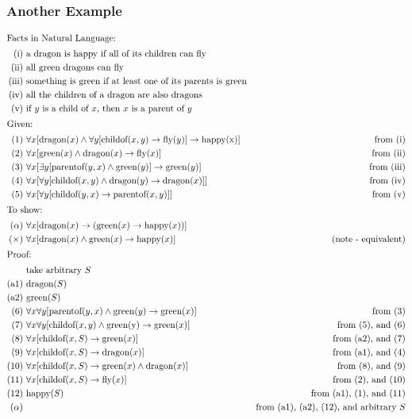 \documentclass[a4paper, 12pt]{article}
\newcommand{\proofline}[3]{(#1)\ & #2 & \text{#3} \\}
\newcommand{\proofarbitrary}[1]{& \text{take arbitrary } #1 \\}
\begin{document}
            \subsubsection*{Another Example}
                \begin{align*}
                    \intertext{Facts in Natural Language:}
                    \proofline{\text{i}}{\text{a dragon is happy if all of its children can fly}}{}
                    \proofline{\text{ii}}{\text{all green dragons can fly}}{}
                    \proofline{\text{iii}}{\text{something is green if at least one of its parents is green}}{}
                    \proofline{\text{iv}}{\text{all the children of a dragon are also dragons}}{}
                    \proofline{\text{v}}{\text{if $y$ is a child of $x$, then $x$ is a parent of $y$}}{}
                    \intertext{Given:}
                    \proofline{1}{\forall x [\text{dragon}(x) \land \forall y [\text{childof}(x, y) \rightarrow \text{fly}(y)] \rightarrow \text{happy(x)}]}{from (i)}
                    \proofline{2}{\forall x [\text{green}(x) \land \text{dragon}(x) \rightarrow \text{fly}(x)]}{from (ii)}
                    \proofline{3}{\forall x [\exists y [\text{parentof}(y, x) \land \text{green}(y)] \rightarrow \text{green}(y)]}{from (iii)}
                    \proofline{4}{\forall x [\forall y [\text{childof}(x, y) \land \text{dragon}(y) \rightarrow \text{dragon}(x)]]}{from (iv)}
                    \proofline{5}{\forall x [\forall y [\text{childof}(y, x) \rightarrow \text{parentof}(x, y)]]}{from (v)}
                    \intertext{To show:}
                    \proofline{\alpha}{\forall x [\text{dragon}(x) \rightarrow (\text{green}(x) \rightarrow \text{happy}(x))]}{}
                    \proofline{\times}{\forall x [\text{dragon}(x) \land \text{green}(x) \rightarrow \text{happy}(x)]}{(note - equivalent)}
                    \intertext{Proof:}
                    \proofarbitrary{S}
                    \proofline{\text{a}1}{\text{dragon}(S)}{}
                    \proofline{\text{a}2}{\text{green}(S)}{}
                    \proofline{6}{\forall x \forall y [\text{parentof}(y, x) \land \text{green}(y) \rightarrow \text{green}(x)]}{from (3)}
                    \proofline{7}{\forall x \forall y [\text{childof}(x, y) \land \text{green(y)} \rightarrow \text{green}(x)]}{from (5), and (6)}
                    \proofline{8}{\forall x [\text{childof}(x, S) \rightarrow \text{green}(x)]}{from (a2), and (7)}
                    \proofline{9}{\forall x [\text{childof}(x, S) \rightarrow \text{dragon}(x)]}{from (a1), and (4)}
                    \proofline{10}{\forall x [\text{childof}(x, S) \rightarrow \text{green}(x) \land \text{dragon}(x)]}{from (8), and (9)}
                    \proofline{11}{\forall x [\text{childof}(x, S) \rightarrow \text{fly}(x)]}{from (2), and (10)}
                    \proofline{12}{\text{happy}(S)}{from (a1), (1), and (11)}
                    \proofline{\alpha}{}{from (a1), (a2), (12), and arbitrary $S$}
                \end{align*}
\end{document}

